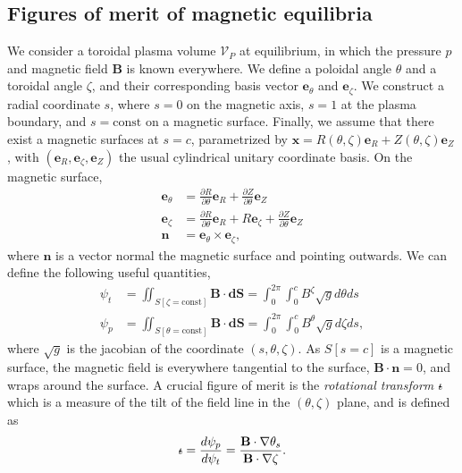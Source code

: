 \documentclass[my_thesis.tex]{subfiles}
\begin{document}
\subsection{Figures of merit of magnetic equilibria}
We consider a toroidal plasma volume $\mathcal{V}_P$ at equilibrium, in which the pressure $p$ and magnetic field $\mathbf{B}$ is known everywhere. We define a poloidal angle $\theta$ and a toroidal angle $\zeta$, and their corresponding basis vector $\mathbf{e}_\theta$ and $\mathbf{e}_\zeta$. We construct a radial coordinate $s$, where $s=0$ on the magnetic axis, $s=1$ at the plasma boundary, and $s=\text{const}$ on a magnetic surface. Finally, we assume that there exist a magnetic surfaces at $s=c$, parametrized by $\mathbf{x}=R(\theta,\zeta)\mathbf{e}_R + Z(\theta,\zeta)\mathbf{e}_Z$, with $(\mathbf{e}_R,\mathbf{e}_\zeta,\mathbf{e}_Z)$ the usual cylindrical unitary coordinate basis. On the magnetic surface, 
\begin{align}
	\mathbf{e}_\theta &= \frac{\partial R}{\partial \theta}\mathbf{e}_R + \frac{\partial Z}{\partial \theta}\mathbf{e}_Z\\
	\mathbf{e}_\zeta &= \frac{\partial R}{\partial \theta}\mathbf{e}_R + R\mathbf{e}_\zeta + \frac{\partial Z}{\partial \theta}\mathbf{e}_Z\\
	\mathbf{n} &= \mathbf{e}_\theta\times\mathbf{e}_\zeta,
\end{align}
where $\mathbf{n}$ is a vector normal the magnetic surface and pointing outwards. We can define the following useful quantities,
\begin{align}
	\psi_t &= \iint_{S[\zeta=\text{const}]} \mathbf{B}\cdot \mathbf{dS} = \int_0^{2\pi}\int_0^c B^\zeta \sqrt{g}d\theta ds\\
	\psi_p &= \iint_{S[\theta=\text{const}]} \mathbf{B}\cdot \mathbf{dS} = \int_0^{2\pi}\int_0^c B^\theta \sqrt{g}d\zeta ds,
\end{align}
where $\sqrt{g}$ is the jacobian of the coordinate $(s,\theta,\zeta)$. As $S[s=c]$ is a magnetic surface, the magnetic field is everywhere tangential to the surface, $\mathbf{B}\cdot\mathbf{n}=0$, and wraps around the surface. A crucial figure of merit is the \emph{rotational transform} $\text{$\iota\!\!$-}$ which is a measure of the tilt of the field line in the $(\theta,\zeta)$ plane, and is defined as
\begin{equation}
	\text{$\iota\!\!$-} = \frac{d\psi_p}{d\psi_t}=\frac{\mathbf{B}\cdot\nabla\theta_s}{\mathbf{B}\cdot\nabla\zeta}.
\end{equation}
\end{document}
